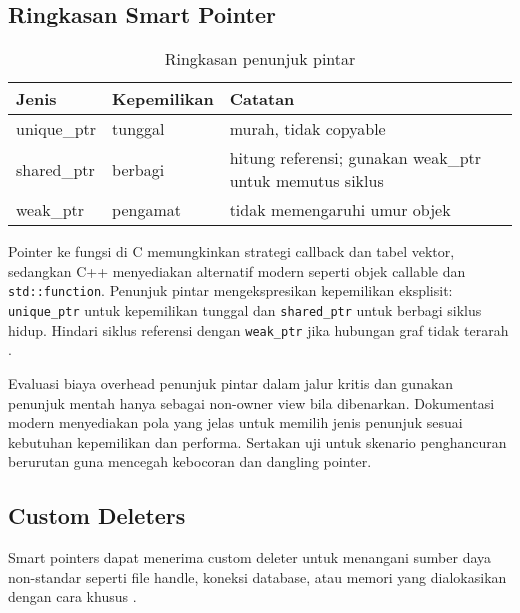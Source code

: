 \documentclass[../main.tex]{subfiles}
\begin{document}
\subsection{Ringkasan Smart Pointer}
\begin{table}[H]
  \centering
  \caption{Ringkasan penunjuk pintar}
  \begin{tabular}{@{}lll@{}}
    \toprule
    Jenis & Kepemilikan & Catatan \\
    \midrule
    unique\_ptr & tunggal & murah, tidak copyable \\
    shared\_ptr & berbagi & hitung referensi; gunakan weak\_ptr untuk memutus siklus \\
    weak\_ptr & pengamat & tidak memengaruhi umur objek \\
    \bottomrule
  \end{tabular}
\end{table}
Pointer ke fungsi di C memungkinkan strategi callback dan tabel vektor, sedangkan C++ menyediakan alternatif modern seperti objek callable dan \texttt{std::function}. Penunjuk pintar mengekspresikan kepemilikan eksplisit: \texttt{unique\_ptr} untuk kepemilikan tunggal dan \texttt{shared\_ptr} untuk berbagi siklus hidup. Hindari siklus referensi dengan \texttt{weak\_ptr} jika hubungan graf tidak terarah \parencite{cpp-reference}.

Evaluasi biaya overhead penunjuk pintar dalam jalur kritis dan gunakan penunjuk mentah hanya sebagai non-owner view bila dibenarkan. Dokumentasi modern menyediakan pola yang jelas untuk memilih jenis penunjuk sesuai kebutuhan kepemilikan dan performa. Sertakan uji untuk skenario penghancuran berurutan guna mencegah kebocoran dan dangling pointer.

\subsection{Custom Deleters}
Smart pointers dapat menerima custom deleter untuk menangani sumber daya non-standar seperti file handle, koneksi database, atau memori yang dialokasikan dengan cara khusus \parencite{cpp-reference}.
\end{document}

